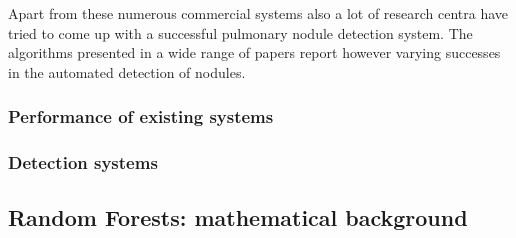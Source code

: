 Apart from these numerous commercial systems also a lot of research centra
have tried to come up with a successful pulmonary nodule detection system. The
algorithms presented in a wide range of papers report however varying successes
in the automated detection of nodules.



\subsubsection{Performance of existing systems}
\subsubsection{Detection systems}



\subsection{Random Forests: mathematical background}






